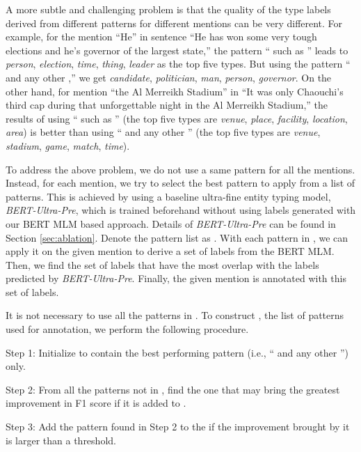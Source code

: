 \documentclass[11pt,a4paper]{article}
\begin{document}
A more subtle and challenging problem is that the quality of the type labels derived from different patterns for different mentions can be very different. For example, for the mention ``He'' in sentence ``He has won some very tough elections and he's governor of the largest state,'' the pattern `` such as '' leads to \textit{person}, \textit{election}, \textit{time}, \textit{thing}, \textit{leader} as the top five types. But using the pattern `` and any other ,'' we get \textit{candidate}, \textit{politician}, \textit{man}, \textit{person}, \textit{governor}.
On the other hand, for mention ``the Al Merreikh Stadium'' in ``It was only Chaouchi's third cap during that unforgettable night in the Al Merreikh Stadium,'' the results of using `` such as '' (the top five types are \textit{venue}, \textit{place}, \textit{facility}, \textit{location}, \textit{area}) is better than using `` and any other '' (the top five types are \textit{venue}, \textit{stadium}, \textit{game}, \textit{match}, \textit{time}).

To address the above problem, we do not use a same pattern for all the mentions. Instead, for each mention, we try to select the best pattern to apply from a list of patterns. This is achieved by using a baseline ultra-fine entity typing model, \textit{BERT-Ultra-Pre}, which is trained beforehand without using labels generated with our BERT MLM based approach. Details of \textit{BERT-Ultra-Pre} can be found in Section \ref{sec:ablation}. Denote the pattern list as . With each pattern in , we can apply it on the given mention to derive a set of labels from the BERT MLM. Then, we find the set of labels that have the most overlap with the labels predicted by \textit{BERT-Ultra-Pre}. Finally, the given mention is annotated with this set of labels.


It is not necessary to use all the patterns in \cite{seitner2016large}. 
To construct , the list of patterns used for annotation, we perform the following procedure.

\vspace{0.1in}
\noindent\hangindent=1.2cm Step 1: Initialize  to contain the best performing pattern (i.e., `` and any other '') only. 


\noindent\hangindent=1.2cm Step 2: From all the patterns not in , find the one that may bring the greatest improvement in F1 score if it is added to .

\noindent\hangindent=1.2cm Step 3: Add the pattern found in Step 2 to the  if the improvement brought by it is larger than a threshold.
\end{document}
